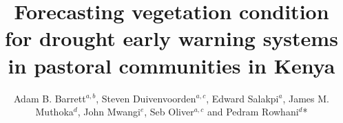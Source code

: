 \documentclass[review]{elsarticle}
\begin{document}
\newcommand{\edit}[1]{\textcolor{blue}{#1}}

\begin{frontmatter}

\title{Forecasting vegetation condition for drought early warning systems in pastoral communities in Kenya}


\author{Adam B. Barrett$^{a,b}$, Steven Duivenvoorden$^{a,c}$, Edward Salakpi$^a$, James M. Muthoka$^{d}$, 
 John Mwangi$^{e}$, Seb Oliver$^{a,c}$ and Pedram Rowhani$^{d}$*}
\address{
	$^{a}$ \quad The Data Intensive Science Centre, Department of Physics and Astronomy, University of Sussex, Brighton BN1 9QH, UK\\
	$^{b}$ \quad Sackler Centre for Consciousness Science, Department of Informatics, University of Sussex, Brighton BN1 9QJ, UK \\
	$^{c}$ \quad Astronomy Centre, Department of Physics and Astronomy, University of Sussex, Brighton BN1 9QH, UK\\
	$^{d}$ \quad School of Global Studies, Department of Geography, University of Sussex, Brighton, BN1 9QJ, UK \\
	$^{e}$ \quad The National Drought Management Authority (NDMA), Lonrho House, Nairobi, Kenya \\
	*Corresponding author: P.Rowhani@sussex.ac.uk
	}








\begin{abstract}


\end{abstract}
\end{frontmatter}
\end{document}
